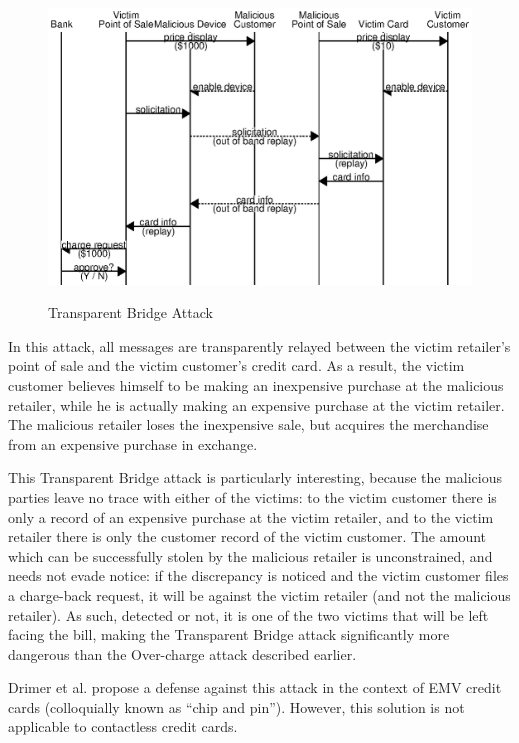 \begin{figure}
  \caption{Transparent Bridge Attack}
  \centering
  	\hspace*{-0.35in}
    \includegraphics{img/attack-mr-bridge.eps}
  \label{fig:attack_bridge}
\end{figure}

In this attack, all messages are transparently relayed between the victim retailer's point of sale and the victim customer's credit card.
As a result, the victim customer believes himself to be making an inexpensive purchase at the malicious retailer, while he is actually making an expensive purchase at the victim retailer.
The malicious retailer loses the inexpensive sale, but acquires the merchandise from an expensive purchase in exchange.

This Transparent Bridge attack is particularly interesting, because the malicious parties leave no trace with either of the victims:
to the victim customer there is only a record of an expensive purchase at the victim retailer, and to the victim retailer there is only the customer record of the victim customer.
The amount which can be successfully stolen by the malicious retailer is unconstrained, and needs not evade notice:
	if the discrepancy is noticed and the victim customer files a charge-back request, it will be against the victim retailer (and not the malicious retailer).
As such, detected or not, it is one of the two victims that will be left facing the bill, making the Transparent Bridge attack significantly more dangerous than the Over-charge attack described earlier.

Drimer et al. propose a defense against this attack in the context of EMV credit cards (colloquially known as ``chip and pin'').
However, this solution is not applicable to contactless credit cards.
